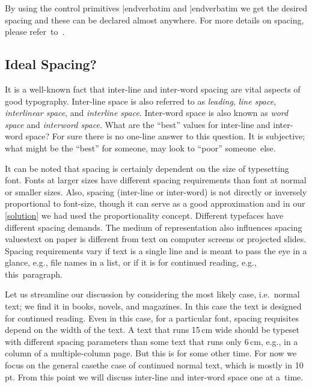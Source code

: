 {{By using the control primitives {\color{brown}\verbatim \spaceskip|endverbatim} and {\color{brown}\verbatim \baselineskip|endverbatim} we get the desired spacing and these can be declared almost anywhere. For more details on spacing, please refer~to~\cite{knuth_texbook}.


\subsection{Ideal Spacing?}It is a well-known fact that inter-line and inter-word spacing are vital aspects of good typography. Inter-line space is also referred to as {\sl leading}, {\sl line space}, {\sl interlinear space}, and {\sl interline space}. Inter-word space is also known as {\sl word space} and {\sl interword space}. What are the ``best'' values for inter-line and inter-word space? For sure there is no one-line answer to this question. It is subjective; what might be the ``best'' for someone, may look to ``poor'' someone~else.

It can be noted that spacing is certainly dependent on the size of typesetting font. Fonts at larger sizes have different spacing requirements than font at normal or smaller sizes. Also, spacing (inter-line or inter-word) is not directly or inversely proportional to font-size, though it can serve as a good approximation and in our \ref{solution} we had used the proportionality concept. Different typefaces have different spacing demands. The medium of representation also influences spacing values\emdash text on paper is different from text on computer screens or projected slides. Spacing requirements vary if text is a single line and is meant to pass the eye in a glance, e.g., file names in a list, or if it is for continued reading, e.g., this~paragraph.

Let us streamline our discussion by considering the most likely case, i.e.\ normal text; we find it in books, novels, and magazines. In this case the text is designed for continued reading. Even in this case, for a particular font, spacing requisites depend on the width of the text. A text that runs 15\,cm wide should be typeset with different spacing parameters than some text that runs only 6\,cm, e.g., in a column of a multiple-column page. But this is for some other time. For now we focus on the general case\emdash the case of continued normal text, which is mostly in 10\,pt. From this point we will discuss inter-line and inter-word space one at a~time.

}}
